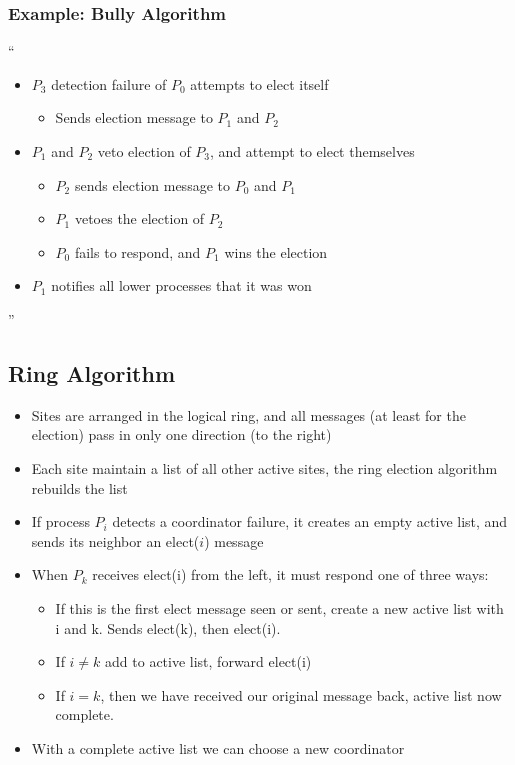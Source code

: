 \documentclass[11pt]{article}
\begin{document}
\subsubsection {Example: Bully Algorithm}
``\begin {itemize}
\item $P_3$ detection failure of $P_0$ attempts to elect itself
\begin{itemize}
\item Sends election message to $P_1$ and $P_2 $
\end{itemize}
\item $P_1$ and $P_2$ veto election of $P_3$, and attempt to elect themselves
\begin {itemize}
\item $P_2$ sends election message to $P_0$ and $P_1$
\item $P_1$ vetoes the election of $P_2$ 
\item $P_0$ fails to respond, and $P_1$ wins the election
\end{itemize}
\item $P_1$ notifies all lower processes that it was won
\end{itemize} ''

\subsection{Ring Algorithm}
\begin {itemize} 
\item Sites are arranged in the logical ring, and all messages (at least for the election) pass in only one direction (to the right)
\item Each site maintain a list of all other active sites, the ring election algorithm rebuilds the list
\item If process $P_i$ detects a coordinator failure, it creates an empty active list, and sends its neighbor an elect($i$) message
\item When $P_k$ receives elect(i) from the left, it must respond one of three ways:
\begin{itemize}
\item If this is the first elect message seen or sent, create a new active list with i and k.  Sends elect(k), then elect(i).
\item If $i\not= k$ add to active list, forward elect(i)
\item If $i=k$, then we have received our original message back, active list now complete.
\end{itemize}
\item With a complete active list we can choose a new coordinator 
\end {itemize}	
\end{document}
